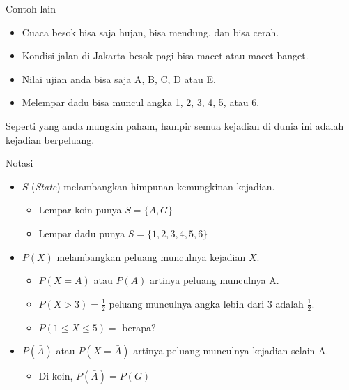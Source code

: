 \documentclass[
  ignorenonframetext,
]{beamer}
\providecommand{\tightlist}{%
  \setlength{\itemsep}{0pt}\setlength{\parskip}{0pt}}\usepackage{longtable,booktabs,array}
\begin{document}
\begin{frame}{Contoh lain}
\label{contoh-lain}
\begin{itemize}
\item
  Cuaca besok bisa saja hujan, bisa mendung, dan bisa cerah.
\item
  Kondisi jalan di Jakarta besok pagi bisa macet atau macet banget.
\item
  Nilai ujian anda bisa saja A, B, C, D atau E.
\item
  Melempar dadu bisa muncul angka 1, 2, 3, 4, 5, atau 6.
\end{itemize}

\pause

Seperti yang anda mungkin paham, hampir semua kejadian di dunia ini
adalah kejadian berpeluang.
\end{frame}

\begin{frame}{Notasi}
\label{notasi-1}
\begin{itemize}[<+->]
\item
  \(S\) (\emph{State}) melambangkan himpunan kemungkinan kejadian.

  \begin{itemize}[<+->]
  \item
    Lempar koin punya \(S=\{A,G\}\)
  \item
    Lempar dadu punya \(S=\{1,2,3,4,5,6\}\)
  \end{itemize}
\item
  \(P(X)\) melambangkan peluang munculnya kejadian \(X\).

  \begin{itemize}[<+->]
  \item
    \(P(X=A)\) atau \(P(A)\) artinya peluang munculnya A.
  \item
    \(P(X>3)=\frac{1}{2}\) peluang munculnya angka lebih dari 3 adalah
    \(\frac{1}{2}\).
  \item
    \(P(1\leq X \leq 5)=\) berapa?
  \end{itemize}
\item
  \(P(\bar{A})\) atau \(P(X=\bar{A})\) artinya peluang munculnya
  kejadian selain A.

  \begin{itemize}[<+->]
  \tightlist
  \item
    Di koin, \(P(\bar{A})=P(G)\)
  \end{itemize}
\end{itemize}
\end{frame}
\end{document}
